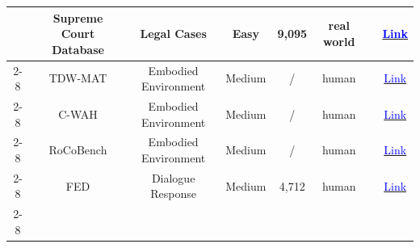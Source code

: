 \begin{table}[!htp]
{\begin{tabular}{c|c|c|c|c|c|c|c}
                                                                                  & Supreme Court Database & Legal Cases             & Easy                & 9,095            & real world          & \cite{hamilton2023blind}                                                                                                                                                        & \href{http://scdb.wustl.edu}{\textcolor{blue}{Link}}                                                                                                              \\ \cline{2-8}
                                                                                  & TDW-MAT                & Embodied Environment    & Medium              & /                & human               & \cite{zhang2023building}                                                                                                                                                        & \href{https://github.com/UMass-Foundation-Model/Co-LLM-Agents/}{\textcolor{blue}{Link}}                                                                           \\ \cline{2-8}
                                                                                  & C-WAH                  & Embodied Environment    & Medium              & /                & human               & \cite{zhang2023building}                                                                                                                                                        & \href{https://github.com/UMass-Foundation-Model/Co-LLM-Agents/}{\textcolor{blue}{Link}}                                                                           \\ \cline{2-8}
                                                                                  & RoCoBench              & Embodied Environment    & Medium              & /                & human               & \cite{mandi2024roco}                                                                                                                                                            & \href{https://github.com/MandiZhao/robot-collab}{\textcolor{blue}{Link}}                                                                                          \\ \cline{2-8}
                                                                                  & FED                    & Dialogue Response       & Medium              & 4,712            & human               & \cite{chen2023agentverse}                                                                                                                                                       & \href{http://shikib.com/fed_data.json}{\textcolor{blue}{Link}}                                                                                                    \\ \cline{2-8}

\end{tabular}}
\end{table}
